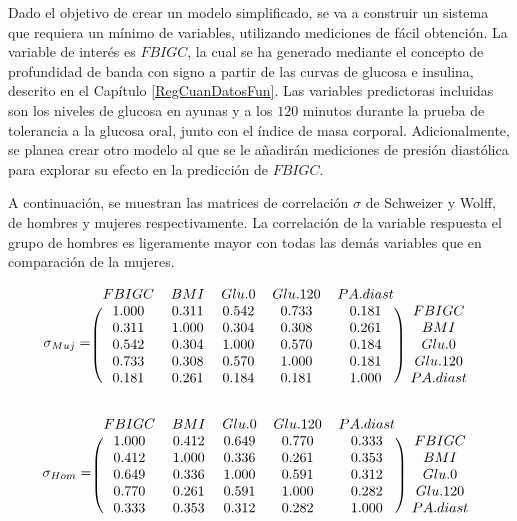 Dado el objetivo de crear un modelo simplificado, se va a construir un sistema que requiera un mínimo de variables, utilizando mediciones de fácil obtención. La variable de interés es $FBIGC$, la cual se ha generado mediante el concepto de profundidad de banda con signo a partir de las curvas de glucosa e insulina, descrito en el Capítulo \ref{RegCuanDatosFun}. Las variables predictoras incluidas son los niveles de glucosa en ayunas y a los $120$ minutos durante la prueba de tolerancia a la glucosa oral, junto con el índice de masa corporal. Adicionalmente, se planea crear otro modelo al que se le añadirán mediciones de presión diastólica para explorar su efecto en la predicción de $FBIGC$.

A continuación, se muestran las matrices de correlación $\sigma$ de Schweizer y Wolff, de hombres y mujeres respectivamente. La correlación de la variable respuesta el grupo de hombres es ligeramente mayor con todas las demás variables que en comparación de la mujeres.

\[
\sigma_{Muj} = \begin{blockarray}{cccccc}
FBIGC      &      BMI      &    Glu.0      &  Glu.120      & PA.diast \\
\begin{block}{(ccccc)c}
1.000 & 0.311 & 0.542 &  0.733 & 0.181 & FBIGC \\
0.311 & 1.000 & 0.304 &  0.308 & 0.261 & BMI \\
0.542 & 0.304 & 1.000 &  0.570 & 0.184 & Glu.0 \\
0.733 & 0.308 & 0.570 &  1.000 & 0.181 & Glu.120 \\
0.181 & 0.261 & 0.184 &  0.181 & 1.000 & PA.diast \\
\end{block}
\end{blockarray}
 \]

\[
\sigma_{Hom} = \begin{blockarray}{cccccc}
FBIGC      &      BMI      &    Glu.0      &  Glu.120      & PA.diast \\
\begin{block}{(ccccc)c}
1.000 & 0.412 & 0.649 & 0.770 & 0.333 & FBIGC \\
0.412 & 1.000 & 0.336 & 0.261 & 0.353 & BMI \\
0.649 & 0.336 & 1.000 & 0.591 & 0.312 & Glu.0 \\
0.770 & 0.261 & 0.591 & 1.000 & 0.282 & Glu.120\\
0.333 & 0.353 & 0.312 & 0.282 & 1.000 & PA.diast \\
\end{block}
\end{blockarray}
 \]

